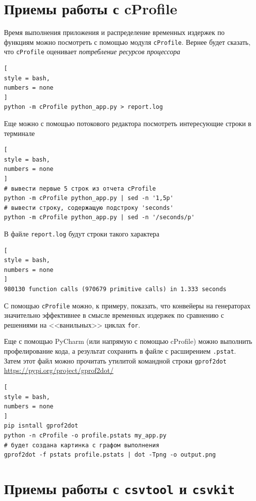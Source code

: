 \documentclass[%
	11pt,
	a4paper,
	utf8,
		]{article}
\begin{document}
\section{Приемы работы с cProfile}

Время выполнения приложения и распределение временных издержек по функциям можно посмотреть с помощью модуля \texttt{cProfile}. Вернее будет сказать, что \texttt{cProfile} оценивает \emph{потребление ресурсов процессора}
\begin{lstlisting}[
style = bash,
numbers = none	
]
python -m cProfile python_app.py > report.log
\end{lstlisting}

Еще можно с помощью потокового редактора посмотреть интересующие строки в терминале
\begin{lstlisting}[
style = bash,
numbers = none	
]
# вывести первые 5 строк из отчета cProfile
python -m cProfile python_app.py | sed -n '1,5p'
# вывести строку, содержащую подстроку 'seconds'
python -m cProfile python_app.py | sed -n '/seconds/p'
\end{lstlisting}

В файле \texttt{report.log} будут строки такого характера
\begin{lstlisting}[
style = bash,
numbers = none	
]
980130 function calls (970679 primitive calls) in 1.333 seconds
\end{lstlisting}

С помощью \texttt{cProfile} можно, к примеру, показать, что конвейеры на генераторах значительно эффективнее в смысле временных издержек по сравнению с решениями на <<ванильных>> циклах \texttt{for}.

Еще с помощью PyCharm (или напрямую с помощью cProfile) можно выполнить профелирование кода, а результат сохранить в файле с расширением \texttt{.pstat}. Затем этот файл можно прочитать утилитой командной строки \texttt{gprof2dot} \url{https://pypi.org/project/gprof2dot/}
\begin{lstlisting}[
style = bash,
numbers = none
]
pip isntall gprof2dot
python -n cProfile -o profile.pstats my_app.py
# будет создана картинка с графом выполнения
gprof2dot -f pstats profile.pstats | dot -Tpng -o output.png 
\end{lstlisting}

\section{Приемы работы с \texttt{csvtool} и \texttt{csvkit}}
\end{document}
